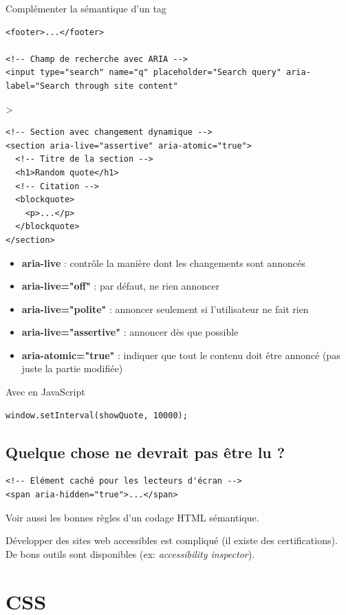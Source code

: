 \documentclass{report}
\begin{document}
\begin{multicols*}{2}
\begin{EExample}{Complémenter la sémantique d'un tag}{}
\begin{lstlisting}[style=HTMLDraculaDark]
<footer>...</footer>

<!-- Champ de recherche avec ARIA -->
<input type="search" name="q" placeholder="Search query" aria-label="Search through site content"
\end{lstlisting}
>\end{EExample}


\begin{lstlisting}[style=HTMLDraculaDark]
<!-- Section avec changement dynamique -->
<section aria-live="assertive" aria-atomic="true">
  <!-- Titre de la section -->
  <h1>Random quote</h1>
  <!-- Citation -->
  <blockquote>
    <p>...</p>
  </blockquote>
</section>
\end{lstlisting}

\begin{itemize}
  \item \textbf{aria-live} : contrôle la manière dont les changements sont annoncés
  \item \textbf{aria-live="off"} : par défaut, ne rien annoncer
  \item \textbf{aria-live="polite"} : annoncer seulement si l'utilisateur ne fait rien
  \item \textbf{aria-live="assertive"} : annoncer dès que possible
  \item \textbf{aria-atomic="true"} : indiquer que tout le contenu doit être annoncé (pas juste la partie modifiée)
\end{itemize}

Avec en JavaScript
\begin{lstlisting}[style=HTMLDraculaDark]
window.setInterval(showQuote, 10000);
\end{lstlisting}


\section{Quelque chose ne devrait pas être lu ?}

\begin{lstlisting}[style=HTMLDraculaDark]
<!-- Elément caché pour les lecteurs d'écran -->
<span aria-hidden="true">...</span>
\end{lstlisting}

Voir aussi les bonnes règles d'un codage HTML sémantique.

Développer des sites web accessibles est compliqué (il existe des certifications). De bons outils sont disponibles (ex: \textit{accessibility inspector}).

\chapter{CSS}


\end{multicols*}
\end{document}
